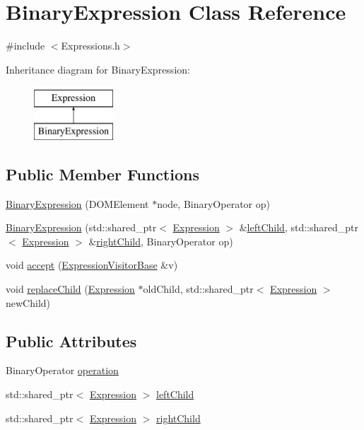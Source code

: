 \hypertarget{class_binary_expression}{\section{Binary\+Expression Class Reference}
\label{class_binary_expression}
}


{\ttfamily \#include $<$Expressions.\+h$>$}

Inheritance diagram for Binary\+Expression\+:\begin{figure}[H]
\begin{center}
\leavevmode
\includegraphics[height=2.000000cm]{class_binary_expression}
\end{center}
\end{figure}
\subsection*{Public Member Functions}
\begin{DoxyCompactItemize}
\item 
\hyperlink{class_binary_expression_a5d19c8f759e63c10af90f1951b5a760d}{Binary\+Expression} (D\+O\+M\+Element $\ast$node, Binary\+Operator op)
\item 
\hyperlink{class_binary_expression_af3c15a9d05697963ebac1e010e894c04}{Binary\+Expression} (std\+::shared\+\_\+ptr$<$ \hyperlink{class_expression}{Expression} $>$ \&\hyperlink{class_binary_expression_a2388939b40f93649cfd3c531b181025e}{left\+Child}, std\+::shared\+\_\+ptr$<$ \hyperlink{class_expression}{Expression} $>$ \&\hyperlink{class_binary_expression_a97803d6333b2fbe6098491136a1445af}{right\+Child}, Binary\+Operator op)
\item 
void \hyperlink{class_binary_expression_a12ea9a0735a8809b01059988b6466d7c}{accept} (\hyperlink{class_expression_visitor_base}{Expression\+Visitor\+Base} \&v)
\item 
void \hyperlink{class_binary_expression_a7ff9236432aef24bca655ab45cf475f2}{replace\+Child} (\hyperlink{class_expression}{Expression} $\ast$old\+Child, std\+::shared\+\_\+ptr$<$ \hyperlink{class_expression}{Expression} $>$ new\+Child)
\end{DoxyCompactItemize}
\subsection*{Public Attributes}
\begin{DoxyCompactItemize}
\item 
Binary\+Operator \hyperlink{class_binary_expression_ac3926bbcc2ed7bb00eca10b4d4e590d2}{operation}
\item 
std\+::shared\+\_\+ptr$<$ \hyperlink{class_expression}{Expression} $>$ \hyperlink{class_binary_expression_a2388939b40f93649cfd3c531b181025e}{left\+Child}
\item 
std\+::shared\+\_\+ptr$<$ \hyperlink{class_expression}{Expression} $>$ \hyperlink{class_binary_expression_a97803d6333b2fbe6098491136a1445af}{right\+Child}
\end{DoxyCompactItemize}
